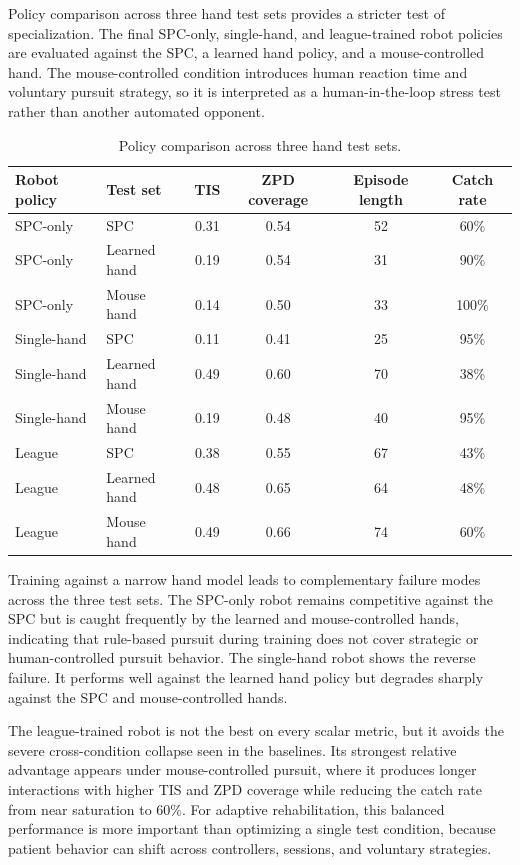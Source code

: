 \documentclass[lettersize,journal]{IEEEtran}
\begin{document}
Policy comparison across three hand test sets provides a stricter test of specialization. The final SPC-only, single-hand, and league-trained robot policies are evaluated against the SPC, a learned hand policy, and a mouse-controlled hand. The mouse-controlled condition introduces human reaction time and voluntary pursuit strategy, so it is interpreted as a human-in-the-loop stress test rather than another automated opponent.

\begin{table}[!t]
\caption{Policy comparison across three hand test sets.}
\label{tab:policy_comparison}
\centering
\small
\setlength{\tabcolsep}{6pt}
\begin{tabular}{@{}llcccc@{}}
\toprule
Robot policy & Test set & TIS & ZPD coverage & Episode length & Catch rate \\
\midrule
SPC-only & SPC & 0.31 & 0.54 & 52 & 60\% \\
SPC-only & Learned hand & 0.19 & 0.54 & 31 & 90\% \\
SPC-only & Mouse hand & 0.14 & 0.50 & 33 & 100\% \\
Single-hand & SPC & 0.11 & 0.41 & 25 & 95\% \\
Single-hand & Learned hand & 0.49 & 0.60 & 70 & 38\% \\
Single-hand & Mouse hand & 0.19 & 0.48 & 40 & 95\% \\
League & SPC & 0.38 & 0.55 & 67 & 43\% \\
League & Learned hand & 0.48 & 0.65 & 64 & 48\% \\
League & Mouse hand & 0.49 & 0.66 & 74 & 60\% \\
\bottomrule
\end{tabular}
\end{table}

Training against a narrow hand model leads to complementary failure modes across the three test sets. The SPC-only robot remains competitive against the SPC but is caught frequently by the learned and mouse-controlled hands, indicating that rule-based pursuit during training does not cover strategic or human-controlled pursuit behavior. The single-hand robot shows the reverse failure. It performs well against the learned hand policy but degrades sharply against the SPC and mouse-controlled hands.

The league-trained robot is not the best on every scalar metric, but it avoids the severe cross-condition collapse seen in the baselines. Its strongest relative advantage appears under mouse-controlled pursuit, where it produces longer interactions with higher TIS and ZPD coverage while reducing the catch rate from near saturation to 60\%. For adaptive rehabilitation, this balanced performance is more important than optimizing a single test condition, because patient behavior can shift across controllers, sessions, and voluntary strategies.
\end{document}
